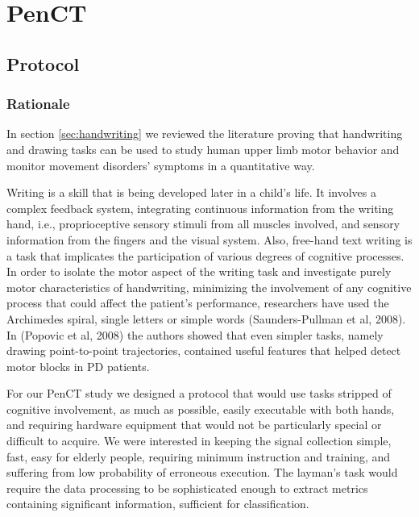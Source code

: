 \section{PenCT}
\label{sec:PenCT}

\subsection{Protocol}
\label{subsec:PenCTProtocol}

\subsubsection{Rationale}
\label{subsubsec:PenCTRationale}
In section \ref{sec:handwriting} we reviewed the literature proving that handwriting and drawing tasks can be used to study human upper limb motor behavior and monitor movement disorders' symptoms in a quantitative way. 

Writing is a skill that is being developed later in a child's life. It involves a complex feedback system, integrating continuous information from the writing hand, i.e., proprioceptive sensory stimuli from all muscles involved, and sensory information from the fingers and the visual system. Also, free-hand text writing is a task that implicates the participation of various degrees of cognitive processes. In order to isolate the motor aspect of the writing task and investigate purely motor characteristics of handwriting, minimizing the involvement of any cognitive process that could affect the patient's performance, researchers have used the Archimedes spiral, single letters or simple words (Saunders-Pullman et al, 2008). In (Popovic et al, 2008) the authors showed that even simpler tasks, namely drawing point-to-point trajectories, contained useful features that helped detect motor blocks in \gls{PD} patients.

For our \gls{PenCT} study we designed a protocol that would use tasks stripped of cognitive involvement, as much as possible, easily executable with both hands, and requiring hardware equipment that would not be particularly special or difficult to acquire. We were interested in keeping the signal collection simple, fast, easy for elderly people, requiring minimum instruction and training, and suffering from low probability of erroneous execution. The layman's task would require the data processing to be sophisticated enough to extract metrics containing significant information, sufficient for classification. 

